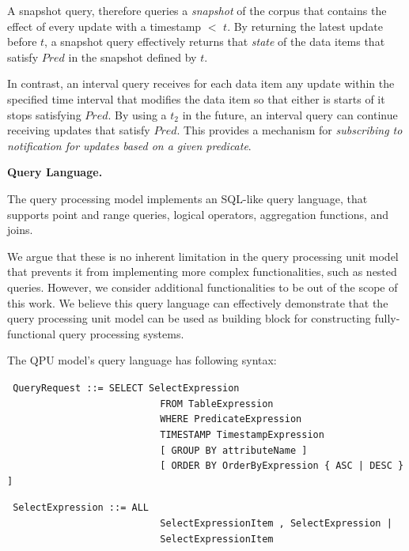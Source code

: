 A snapshot query, therefore queries a \textit{snapshot} of the corpus that contains the effect of every update with a
timestamp $<$ $t$.
By returning the latest update before $t$, a snapshot query effectively returns that \textit{state} of the data items
that satisfy $Pred$ in the snapshot defined by $t$.

In contrast, an interval query receives for each data item any update within the specified time interval that modifies
the data item so that either is starts of it stops satisfying $Pred$.
By using a $t_2$ in the future, an interval query can continue receiving updates that satisfy $Pred$.
This provides a mechanism for \textit{subscribing to notification for updates based on a given predicate}.

\bigskip

\textbf{Query Language.}

The query processing model implements an SQL-like query language,
that supports point and range queries, logical operators, aggregation functions, and joins.

We argue that these is no inherent limitation in the query processing unit model that prevents it from implementing
more complex functionalities, such as nested queries.
However, we consider additional functionalities to be out of the scope of this work.
We believe this query language can effectively demonstrate that the query processing unit model can be used as building
block for constructing fully-functional query processing systems.

The QPU model's query language has following syntax:

{\obeylines\obeyspaces
\texttt{
QueryRequest          ::=  SELECT SelectExpression
~~~~~~~~~~~~~~~~~~~~~~~~~~~FROM TableExpression
~~~~~~~~~~~~~~~~~~~~~~~~~~~WHERE PredicateExpression
~~~~~~~~~~~~~~~~~~~~~~~~~~~TIMESTAMP TimestampExpression 
~~~~~~~~~~~~~~~~~~~~~~~~~~~[ GROUP BY attributeName ]
~~~~~~~~~~~~~~~~~~~~~~~~~~~[ ORDER BY OrderByExpression \{ ASC | DESC \} ]
}}

{\obeylines\obeyspaces
\texttt{
SelectExpression      ::=  ALL
~~~~~~~~~~~~~~~~~~~~~~~~~~~SelectExpressionItem , SelectExpression |
~~~~~~~~~~~~~~~~~~~~~~~~~~~SelectExpressionItem
}}

